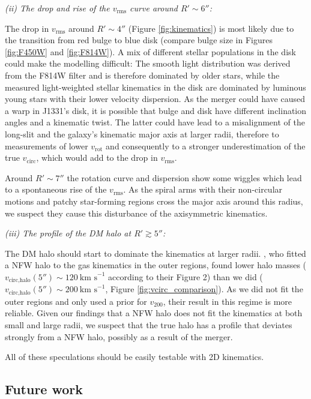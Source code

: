\documentclass[useAMS,usenatbib]{mnras}
\begin{document}
\emph{(ii) The drop and rise of the $v_\text{rms}$ curve around $R'\sim 6''$:}

The drop in $v_\text{rms}$ around $R'\sim4''$ (Figure \ref{fig:kinematics}) is most likely due to the transition from red bulge to blue disk (compare bulge size in Figures \ref{fig:F450W} and \ref{fig:F814W}). A mix of different stellar populations in the disk could make the modelling difficult: The smooth light distribution was derived from the F814W filter and is therefore dominated by older stars, while the measured light-weighted stellar kinematics in the disk are dominated by luminous young stars with their lower velocity dispersion. As the merger could have caused a warp in J1331's disk, it is possible that bulge and disk have different inclination angles and a kinematic twist. The latter could have lead to a misalignment of the long-slit and the galaxy's kinematic major axis at larger radii, therefore to measurements of lower $v_\text{rot}$ and consequently to a stronger underestimation of the true $v_\text{circ}$, which would add to the drop in $v_\text{rms}$.

Around $R'\sim7''$ the rotation curve and dispersion show some wiggles which lead to a spontaneous rise of the $v_\text{rms}$. As the spiral arms with their non-circular motions and patchy star-forming regions cross the major axis around this radius, we suspect they cause this disturbance of the axisymmetric kinematics.

\emph{(iii) The profile of the DM halo at $R'\gtrsim 5''$:}

The DM halo should start to dominate the kinematics at larger radii. \cite{SWELLSV}, who fitted a NFW halo to the gas kinematics in the outer regions, found lower halo masses ($v_\text{circ,halo}(5'') \sim 120~\text{km s}^{-1}$ according to their Figure 2) than we did ($v_\text{circ,halo}(5'') \sim 200~\text{km s}^{-1}$, Figure \ref{fig:vcirc_comparison}). As we did not fit the outer regions and only used a prior for $v_\text{200}$, their result in this regime is more reliable. Given our findings that a NFW halo does not fit the kinematics at both small and large radii, we suspect that the true halo has a profile that deviates strongly from a NFW halo, possibly as a result of the merger.

All of these speculations should be easily testable with 2D kinematics.

\subsection{Future work}
\end{document}

